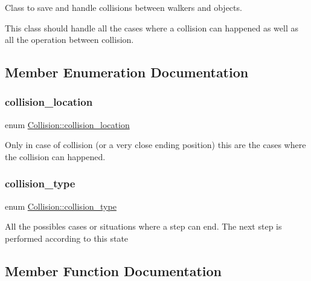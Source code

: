 Class to save and handle collisions between walkers and objects.

This class should handle all the cases where a collision can happened as well as all the operation between collision. 

\subsection{Member Enumeration Documentation}
\mbox{\label{class_collision_aad433eb4e51dbfd7ab9bbe188fbe47ab}} 
\subsubsection{\texorpdfstring{collision\+\_\+location}{collision\_location}}
{\footnotesize\ttfamily enum \hyperlink{class_collision_aad433eb4e51dbfd7ab9bbe188fbe47ab}{Collision\+::collision\+\_\+location}}





Only in case of collision (or a very close ending position) this are the cases where the collision can happened. \mbox{\label{class_collision_aa7f309840b693689b164c7e4b4d643e5}} 
\subsubsection{\texorpdfstring{collision\+\_\+type}{collision\_type}}
{\footnotesize\ttfamily enum \hyperlink{class_collision_aa7f309840b693689b164c7e4b4d643e5}{Collision\+::collision\+\_\+type}}





All the possibles cases or situations where a step can end. The next step is performed according to this state 

\subsection{Member Function Documentation}
\mbox{\label{class_collision_aa7ec5170357d8913c390defd844686e1}} 
